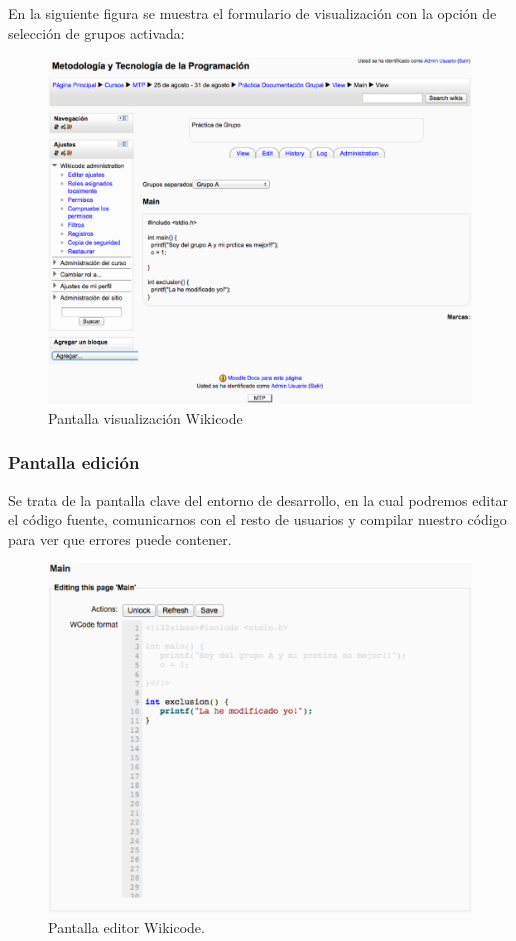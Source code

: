 En la siguiente figura se muestra el formulario de visualización con la opción de selección de grupos activada:

\begin{figure}[h]
	\centering
	\includegraphics[width=\textwidth]{./img/c4view.eps}
	\caption{Pantalla visualización Wikicode}
\end{figure}

\newpage

\subsubsection{Pantalla edición}

Se trata de la pantalla clave del entorno de desarrollo, en la cual podremos editar el código fuente, comunicarnos con el resto de usuarios y compilar nuestro código para ver que errores puede contener.

\begin{figure}[h]
	\begin{center}
	\includegraphics[width=\textwidth]{./img/c4edit.eps}
	\caption{Pantalla editor Wikicode.}
	\end{center}
\end{figure}

